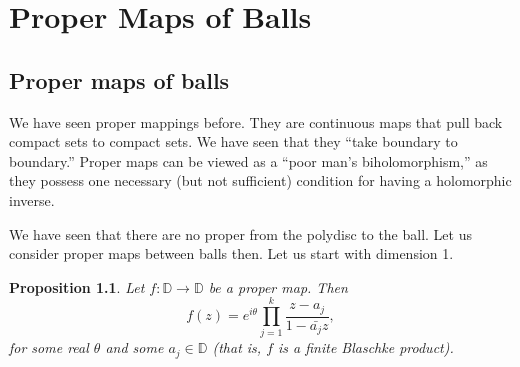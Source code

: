 \documentclass[12pt,openany]{book}
\newcommand{\bD}{{\mathbb{D}}}
\newcommand{\sectionnewpage}{}
\theoremstyle{plain}
\newtheorem{prop}[thm]{Proposition}
\theoremstyle{remark}
\theoremstyle{definition}
\theoremstyle{exercise}
\theoremstyle{example}
\begin{document}
%
%
%
%
%
%



\chapter{Proper Maps of Balls} \label{proper:chapter}


\section{Proper maps of balls}

We have seen proper mappings before. They are continuous maps that pull back
compact sets to compact sets.  We have seen that they ``take boundary to
boundary.''  Proper maps can be viewed as a ``poor man's biholomorphism,'' as
they possess one necessary (but not sufficient) condition for having a
holomorphic inverse.

We have seen that there are no proper from the polydisc to the ball.
Let us consider proper maps between balls then.  Let us start with dimension
1.

\begin{prop}
Let $f \colon \bD \to \bD$ be a proper map.  Then
\begin{equation}
f(z) = 
e^{i\theta} \prod_{j=1}^k \frac{z-a_j}{1-\bar{a_j} z} ,
\end{equation}
for some real $\theta$ and some $a_j \in \bD$ (that is, $f$ is a finite
Blaschke product).
\end{prop}
\end{document}
